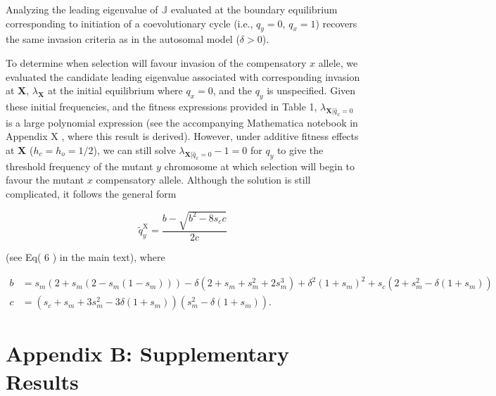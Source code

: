 \documentclass{article}
\newcommand\hl[1]{%
  \bgroup
  \hskip0pt\color{blue!80!black}%
  #1%
  \egroup
}
\begin{document}
\noindent Analyzing the leading eigenvalue of $\mathbb{J}$ evaluated at the boundary equilibrium corresponding to initiation of a coevolutionary cycle (i.e., $q_y = 0$, $q_x = 1$) recovers the same invasion criteria as in the autosomal model ($\delta > 0$).

To determine when selection will favour invasion of the compensatory $x$ allele, we evaluated the candidate leading eigenvalue associated with corresponding invasion at $\mathbf{X}$, $\lambda_{\mathbf{X}}$ at the initial equilibrium where $q_x = 0$, and the $q_y$ is unspecified. Given these initial frequencies, and the fitness expressions provided in Table 1, $\lambda_{\mathbf{X}|\hat{q}_x = 0}$ is a large polynomial expression (see the accompanying Mathematica notebook in Appendix \hl{X}, where this result is derived). However, under additive fitness effects at $\mathbf{X}$ ($h_c = h_o = 1/2$), we can still solve $\lambda_{\mathbf{X}|\hat{q}_x = 0} - 1 = 0$ for $q_y$ to give the threshold frequency of the mutant $y$ chromosome at which selection will begin to favour the mutant $x$ compensatory allele. Although the solution is still complicated, it follows the general form

\begin{equation} \label{eq:xInvDelta-threshold}
	\tilde{q}_y^{\text{X}} = \frac{b - \sqrt{b^2 - 8 s_c c}} {2 c}
\end{equation}

\noindent (see Eq(\hl{6}) in the main text), where 

\begin{subequations}
	\begin{align}
		b &= s_m (2 + s_m (2 - s_m(1 - s_m))) - \delta (2 + s_m + s_m^2 + 2 s_m^3) + \delta^2(1 + s_m)^2 + s_c (2 + s_m^2 - \delta(1 + s_m)) \\
		c &= (s_c + s_m + 3 s_m^2 - 3 \delta(1 + s_m)) (s_m^2 - \delta(1 + s_m)).
	\end{align}
\end{subequations}

\noindent 

\newpage
\section{Appendix B: Supplementary Results} \label{sec:SuppResults}
\renewcommand{\theequation}{B\arabic{equation}}
\setcounter{equation}{0}
\renewcommand{\thefigure}{B\arabic{figure}}
\setcounter{figure}{0}
\end{document}
